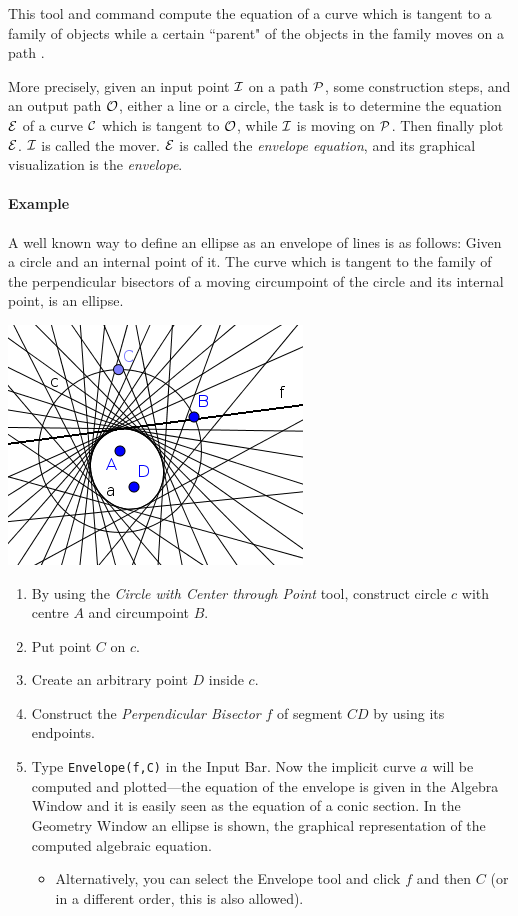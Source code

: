 \documentclass{article}
\begin{document}
This tool and command compute the equation of a curve which is tangent to a family of objects while a certain ``parent" of the objects in the family moves on a path \cite{BotanaRecio2017}.

More precisely, given an input point $\cal{I}$ on a path $\cal{P}$, some construction steps, and an output path $\cal O$, either a line or a circle, the task is to determine the equation $\cal E$ of a curve $\cal C$ which is tangent to $\cal O$, while $\cal I$ is moving on $\cal P$. Then finally plot $\cal E$. $\cal I$ is called the mover. $\cal E$ is called the \textit{envelope equation}, and its graphical visualization is the \textit{envelope}.


\paragraph{Example} A well known way to define an ellipse as an envelope of lines is as follows:
Given a circle and an internal point of it.
The curve which is tangent to the family of the perpendicular bisectors of a moving circumpoint
of the circle and its internal point, is an ellipse.

\begin{center}
\includegraphics[scale=0.5]{Envelope-example}
\end{center}
\begin{enumerate}
    \item By using the \textit{Circle with Center through Point} tool, construct circle $c$ with centre $A$ and circumpoint $B$.
    \item Put point $C$ on $c$.
    \item Create an arbitrary point $D$ inside $c$.
    \item Construct the \textit{Perpendicular Bisector} $f$ of segment $CD$ by using its endpoints.
    \item Type \texttt{Envelope(f,C)} in the Input Bar. Now the implicit curve $a$ will be computed and plotted---the equation of the envelope is given in the Algebra Window and it is easily seen as
the equation of a conic section. In the Geometry Window an ellipse is shown, the graphical
representation of the computed algebraic equation.
    \begin{itemize}
    \item Alternatively, you can select the Envelope tool  and click $f$ and then $C$ (or in a different order, this is also allowed).
    \end{itemize}
\end{enumerate}
\end{document}
